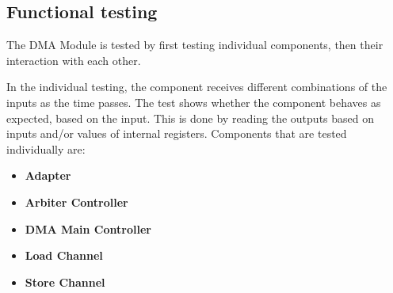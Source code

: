 \begin{appendix}
\subsection{Functional testing}
The DMA Module is tested by first testing individual components, then their interaction with each other.

In the individual testing, the component receives different combinations of the inputs as the time passes.
The test shows whether the component behaves as expected, based on the input.
This is done by reading the outputs based on inputs and/or values of internal registers.
Components that are tested individually are:
\begin{itemize}
    \item \textbf{Adapter} 
    \item \textbf{Arbiter Controller}
    \item \textbf{DMA Main Controller}
    \item \textbf{Load Channel}
    \item \textbf{Store Channel}
\end{itemize}


\end{appendix}
